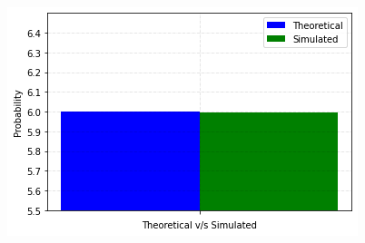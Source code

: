 \documentclass[journal,12pt,twocolumn]{IEEEtran}
\begin{document}
\begin{figure}[h]
    \centering
    \includegraphics[width = \columnwidth]{Figure_1.png}
    \caption{}
    \label{fig:my_label}
\end{figure}
\end{document}
